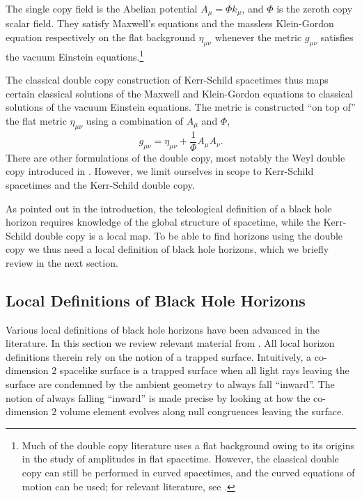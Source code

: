 The single copy field is the Abelian potential $A_{\mu} = \Phi k_{\mu}$, and $\Phi$ is the zeroth copy scalar
field. They satisfy Maxwell's equations and the massless Klein-Gordon equation respectively on the flat background
$\eta_{\mu \nu}$ whenever the metric $g_{\mu \nu}$ satisfies the vacuum Einstein equations.\footnote{
\label{Horizons:FlatVCurvedFootnote}  Much of the double copy literature uses a flat background owing to its origins in the
study of amplitudes in flat spacetime. However, the classical double copy can still be performed in curved
spacetimes, and the curved equations of motion can be used; for relevant literature, see \cite{Alawadhi:2020jrv,
Gurses:2018ckx,Bahjat-Abbas:2017htu, Carrillo-Gonzalez:2017iyj, Prabhu:2020avf, Adamo:2017nia, Alkac:2021bav,
Han:2022mze,Han:2022ubu}.}

The classical double copy construction of Kerr-Schild spacetimes thus maps certain classical solutions of the
Maxwell and Klein-Gordon equations to classical solutions of the vacuum Einstein equations. The metric is 
constructed ``on top of'' the flat metric $\eta_{\mu \nu}$ using a combination of $A_{\mu}$ and $\Phi$,
\begin{equation} \label{Horizons:kerrSchildMetricFromA} 
    g_{\mu \nu} = \eta_{\mu \nu} + \frac{1}{\Phi} A_{\mu} A_{\nu}.
\end{equation}
There are other formulations of the double copy, most notably the Weyl double copy introduced in
\cite{Luna:2018dpt}. However, we limit ourselves in scope to Kerr-Schild spacetimes and the Kerr-Schild double copy.

As pointed out in the introduction, the teleological definition of a black hole horizon requires knowledge of the
global structure of spacetime, while the Kerr-Schild double copy is a local map. To be able to find horizons using
the double copy we thus need a local definition of black hole horizons, which we briefly review in the next
section.

\subsection{Local Definitions of Black Hole Horizons} \label{Horizons:sec:localHorizonDefs}

Various local definitions of black hole horizons have been advanced in the literature. 
In this section we review relevant material from \cite{Gourgoulhon:2008pu}. All local horizon definitions therein
rely on the notion of a trapped surface. Intuitively, a co-dimension $2$ spacelike surface is a trapped surface
when all light rays leaving the surface are condemned by the ambient geometry to always fall ``inward''. The notion
of always falling ``inward'' is made precise by looking at how the co-dimension $2$ volume element evolves along
null congruences leaving the surface.

